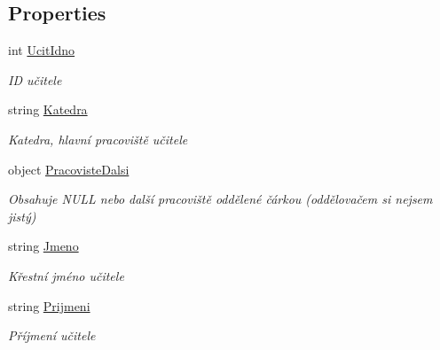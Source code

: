 \subsection*{Properties}
\begin{DoxyCompactItemize}
\item 
int \hyperlink{class_analyza_rozvrhu_1_1_s_t_a_g___classes_1_1_ucitel_aa31070deb4a06b2d7c28bc2bbf6cc9bc}{Ucit\+Idno}
\begin{DoxyCompactList}\small\item\em ID učitele \end{DoxyCompactList}\item 
string \hyperlink{class_analyza_rozvrhu_1_1_s_t_a_g___classes_1_1_ucitel_a3fef2f673df55a05dae32844e7bf6058}{Katedra}
\begin{DoxyCompactList}\small\item\em Katedra, hlavní pracoviště učitele \end{DoxyCompactList}\item 
object \hyperlink{class_analyza_rozvrhu_1_1_s_t_a_g___classes_1_1_ucitel_acadda0929393b357c47a51b737206c90}{Pracoviste\+Dalsi}
\begin{DoxyCompactList}\small\item\em Obsahuje N\+U\+LL nebo další pracoviště oddělené čárkou (oddělovačem si nejsem jistý) \end{DoxyCompactList}\item 
string \hyperlink{class_analyza_rozvrhu_1_1_s_t_a_g___classes_1_1_ucitel_a201647066909cdcdfc02ccc49f64bde2}{Jmeno}
\begin{DoxyCompactList}\small\item\em Křestní jméno učitele \end{DoxyCompactList}\item 
string \hyperlink{class_analyza_rozvrhu_1_1_s_t_a_g___classes_1_1_ucitel_a89e967050f78a66cb58ef01a254eb94b}{Prijmeni}
\begin{DoxyCompactList}\small\item\em Příjmení učitele \end{DoxyCompactList}\item 

\end{DoxyCompactItemize}
